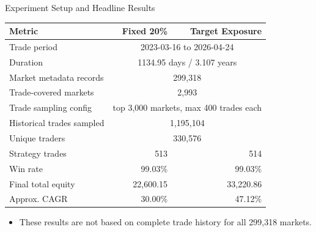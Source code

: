 \documentclass[11pt,aspectratio=169]{beamer}
\begin{document}
\begin{frame}{Experiment Setup and Headline Results}
  \begin{table}
    \centering
    \begin{tabular}{lrr}
      \toprule
      Metric & Fixed 20\% & Target Exposure \\
      \midrule
      Trade period & \multicolumn{2}{c}{2023-03-16 to 2026-04-24} \\
      Duration & \multicolumn{2}{c}{1134.95 days / 3.107 years} \\
      Market metadata records & \multicolumn{2}{c}{299,318} \\
      Trade-covered markets & \multicolumn{2}{c}{2,993} \\
      Trade sampling config & \multicolumn{2}{c}{top 3,000 markets, max 400 trades each} \\
      Historical trades sampled & \multicolumn{2}{c}{1,195,104} \\
      Unique traders & \multicolumn{2}{c}{330,576} \\
      Strategy trades & 513 & 514 \\
      Win rate & 99.03\% & 99.03\% \\
      Final total equity & 22,600.15 & 33,220.86 \\
      Approx. CAGR & 30.00\% & 47.12\% \\
      \bottomrule
    \end{tabular}
  \end{table}

  \vspace{0.15cm}
  \begin{itemize}
    \item These results are not based on complete trade history for all 299,318 markets.
  \end{itemize}
\end{frame}
\end{document}
